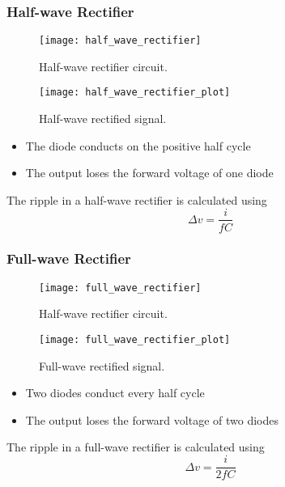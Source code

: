 \documentclass{article}
\begin{document}
\subsubsection{Half-wave Rectifier}
\begin{figure}[H]
    \centering
    \texttt{[image: half\_wave\_rectifier]}
    \caption{Half-wave rectifier circuit.}
\end{figure}
\begin{figure}[H]
    \centering
    \texttt{[image: half\_wave\_rectifier\_plot]}
    \caption{Half-wave rectified signal.}
\end{figure}
\begin{itemize}
    \item The diode conducts on the positive half cycle
    \item The output loses the forward voltage of one diode
\end{itemize}
The ripple in a half-wave rectifier is calculated using
\begin{equation*}
    \Delta v = \frac{i}{fC}
\end{equation*}
\subsubsection{Full-wave Rectifier}
\begin{figure}[H]
    \centering
    \texttt{[image: full\_wave\_rectifier]}
    \caption{Half-wave rectifier circuit.}
\end{figure}
\begin{figure}[H]
    \centering
    \texttt{[image: full\_wave\_rectifier\_plot]}
    \caption{Full-wave rectified signal.}
\end{figure}
\begin{itemize}
    \item Two diodes conduct every half cycle
    \item The output loses the forward voltage of two diodes
\end{itemize}
The ripple in a full-wave rectifier is calculated using
\begin{equation*}
    \Delta v = \frac{i}{2fC}
\end{equation*}
\end{document}
